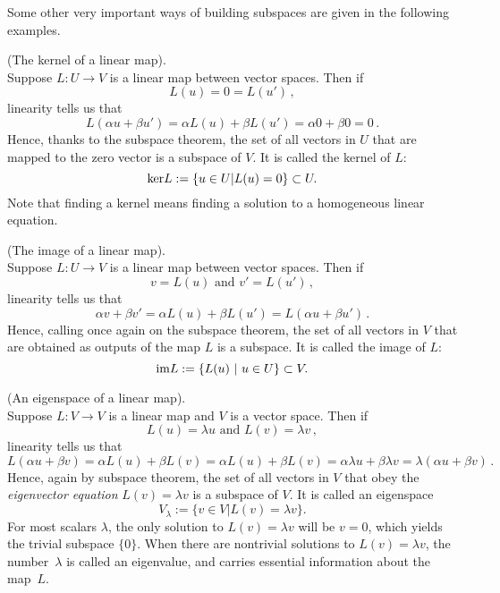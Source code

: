 
Some other very important ways of building subspaces are given in the following examples.

\begin{example}
(The kernel of a linear map).\\[-2mm]

\noindent
Suppose $L:U\to V$ is a linear map between vector spaces. Then if
\[
L(u)=0=L(u')\, ,
\]
linearity tells us that
\[
L(\alpha u + \beta u') = \alpha L(u) + \beta L(u') =\alpha 0 + \beta 0 = 0\, .
\]
Hence, thanks to the subspace theorem,  the set of all vectors in $U$ that are mapped to the zero vector is a subspace of $V$.
It is called the kernel of $L$:
\[
{\rm ker} L:=\{u\in U| L(u) = 0\}\subset U.
\]
Note that finding a kernel means finding a solution to a homogeneous linear equation. 
\end{example}

\begin{example}
(The image of a linear map).\\[-2mm]

\noindent
Suppose $L:U\to V$ is a linear map between vector spaces. Then if
\[
v=L(u) \mbox{ and } v'=L(u')\, ,
\]
linearity tells us that
\[
\alpha v + \beta v' = \alpha L(u) + \beta L(u') =L(\alpha u +\beta u')\, .
\]
Hence, calling once again on the subspace theorem,  the set of all vectors in $V$ that are obtained as outputs of the
map $L$ is a subspace.
It is called the image of $L$:
\[
{\rm im} L:=\{L(u) \ |\  u\in U \}\subset V.
\]
\end{example}

\begin{example}
(An eigenspace of a linear map).\\[-2mm]

\noindent
Suppose $L:V\to V$ is a linear map and $V$ is a vector space. Then if
\[
L(u)=\lambda u \mbox{ and } L(v)=\lambda v\, ,
\]
linearity tells us that
\[
L(\alpha u + \beta v) = \alpha L(u) + \beta L(v) =\alpha L(u) + \beta L(v) =\alpha \lambda u  + \beta \lambda v = \lambda (\alpha u + \beta v)\, .
\]
Hence, again by subspace theorem, the set of all vectors in $V$ that
obey the {\it eigenvector equation} $L(v)=\lambda v$ is a subspace of $V$. 
It is called an eigenspace
\[
V_\lambda:=\{v\in V| L(v) = \lambda v\}.
\]
For most scalars $\lambda$, the only solution to $L(v) = \lambda v$ will be $v=0$, which yields the trivial subspace $\{0\}$.
When there are nontrivial solutions to $L(v)=\lambda v$, the number~$\lambda$ is called an eigenvalue, and carries
essential information about the map~$L$. 
\end{example}

